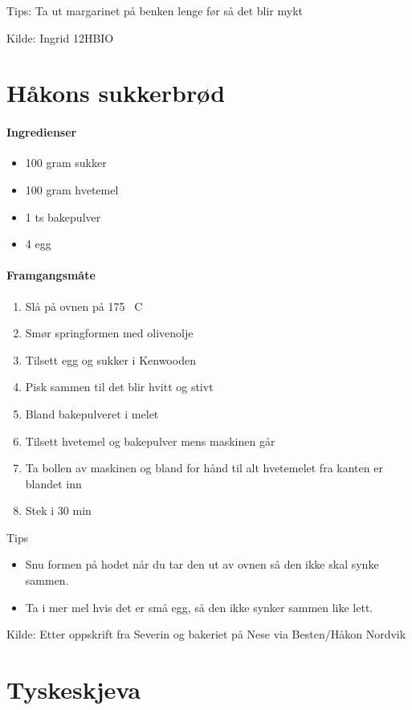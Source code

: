 \documentclass[12pt,a4paper]{book}
\begin{document}
Tips: Ta ut margarinet på benken lenge før så det blir mykt

Kilde: Ingrid 12HBIO
\clearpage{}
\clearpage{}\section{﻿Håkons sukkerbrød}
\label{sukkerbrod}

\paragraph{Ingredienser}
\begin{itemize}[noitemsep]
	\item 100 gram sukker
	\item 100 gram hvetemel
	\item 1 ts bakepulver
	\item 4 egg
\end{itemize}

\paragraph{Framgangsmåte}
\begin{enumerate}[noitemsep]
	\item Slå på ovnen på 175 \degree~C
	\item Smør springformen med olivenolje
	\item Tilsett egg og sukker i Kenwooden
	\item Pisk sammen til det blir hvitt og stivt
	\item Bland bakepulveret i melet
	\item Tilsett hvetemel og bakepulver mens maskinen går
	\item Ta bollen av maskinen og bland for hånd til alt hvetemelet fra kanten er blandet inn
	\item Stek i 30 min
\end{enumerate}


Tips
\begin{itemize}[noitemsep]
	\item Snu formen på hodet når du tar den ut av ovnen så den ikke skal synke sammen.
	\item Ta i mer mel hvis det er små egg, så den ikke synker sammen like lett.\\
\end{itemize}

Kilde: Etter oppskrift fra Severin og bakeriet på Nese via Besten/Håkon Nordvik
\clearpage{}
\clearpage{}\section{﻿Tyskeskjeva}
\end{document}
